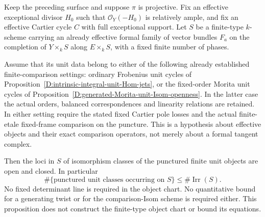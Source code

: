 \begin{proposition}
\label{D:effective-formal-unit-family-class-openness}
Keep the preceding surface and suppose $\pi$ is projective.
Fix an effective exceptional divisor $H_0$ such that
$\mathcal O_Y(-H_0)$ is relatively ample, and fix an
effective Cartier cycle $C$ with full exceptional support.
Let $S$ be a finite-type $k$-scheme carrying an already
effective formal family of vector bundles $F_a$ on the
completion of $Y\times_k S$ along $E\times_k S$, with a
fixed finite number of phases.

Assume that its unit data belong to either of the following
already established finite-comparison settings:
ordinary Frobenius unit cycles of
Proposition~\ref{D:intrinsic-integral-unit-Hom-jets}, or
the fixed-order Morita unit cycles of
Proposition~\ref{D:generated-Morita-unit-Isom-openness}.
In the latter case the actual orders, balanced
correspondences and linearity relations are retained.
In either setting require the stated fixed Cartier pole
losses and the actual finite-etale fixed-frame comparison
on the puncture. This is a hypothesis about effective
objects and their exact comparison operators, not merely
about a formal tangent complex.

Then the loci in $S$ of isomorphism classes of the
punctured finite unit objects are open and closed.
In particular
\[
 \#\{\text{punctured unit classes occurring on }S\}
                         \le\#\operatorname{Irr}(S). \tag{D.IP.8}
\]
No fixed determinant line is required in the object
chart. No quantitative bound for a generating twist
or for the comparison-Isom scheme is required either.
This proposition does not construct the finite-type
object chart or bound its equations.
\end{proposition}

